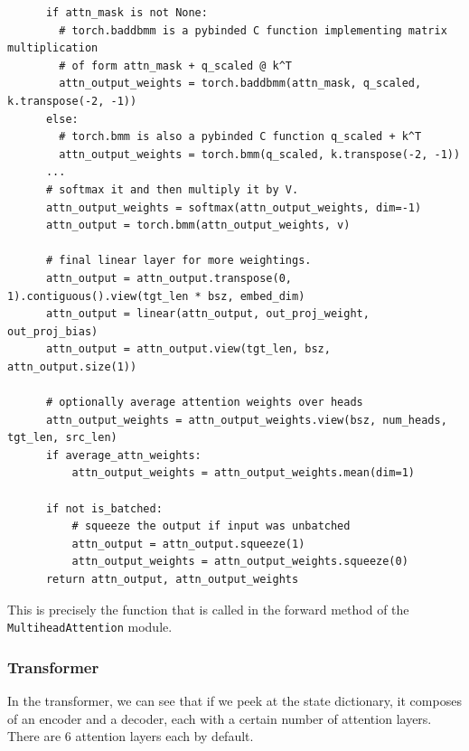 \begin{lstlisting}
      if attn_mask is not None:
        # torch.baddbmm is a pybinded C function implementing matrix multiplication 
        # of form attn_mask + q_scaled @ k^T
        attn_output_weights = torch.baddbmm(attn_mask, q_scaled, k.transpose(-2, -1))
      else:
        # torch.bmm is also a pybinded C function q_scaled + k^T
        attn_output_weights = torch.bmm(q_scaled, k.transpose(-2, -1))
      ...
      # softmax it and then multiply it by V. 
      attn_output_weights = softmax(attn_output_weights, dim=-1)
      attn_output = torch.bmm(attn_output_weights, v)

      # final linear layer for more weightings. 
      attn_output = attn_output.transpose(0, 1).contiguous().view(tgt_len * bsz, embed_dim)
      attn_output = linear(attn_output, out_proj_weight, out_proj_bias)
      attn_output = attn_output.view(tgt_len, bsz, attn_output.size(1))

      # optionally average attention weights over heads
      attn_output_weights = attn_output_weights.view(bsz, num_heads, tgt_len, src_len)
      if average_attn_weights:
          attn_output_weights = attn_output_weights.mean(dim=1)

      if not is_batched:
          # squeeze the output if input was unbatched
          attn_output = attn_output.squeeze(1)
          attn_output_weights = attn_output_weights.squeeze(0)
      return attn_output, attn_output_weights
    \end{lstlisting}

    This is precisely the function that is called in the forward method of the \texttt{MultiheadAttention} module. 

  \subsubsection{Transformer}

    In the transformer, we can see that if we peek at the state dictionary, it composes of an encoder and a decoder, each with a certain number of attention layers. There are 6 attention layers each by default. 

